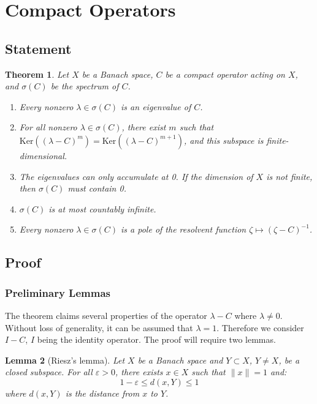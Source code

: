 \documentclass{article}
\newtheorem{theorem}{Theorem}
\newtheorem{lemma}[theorem]{Lemma}
\theoremstyle{definition}
\begin{document}
\section{Compact Operators}

\subsection{Statement}
\begin{theorem}
Let $X$ be a Banach space, $C$ be a compact operator acting on $X$, and $\sigma(C)$ be the spectrum of $C$.
\begin{enumerate}[label=\roman*.]
\item Every nonzero $\lambda \in \sigma(C)$ is an eigenvalue of $C$.
\item For all nonzero $\lambda \in \sigma(C)$, there exist $m$ such that $\text{Ker}((\lambda - C)^m) = \text{Ker}((\lambda - C)^{m+1})$, and this subspace is finite-dimensional.
\item The eigenvalues can only accumulate at 0. If the dimension of $X$ is not finite, then $\sigma(C)$ must contain 0.
\item $\sigma(C)$ is at most countably infinite.
\item Every nonzero $\lambda \in \sigma(C)$ is a pole of the resolvent function $\zeta \mapsto (\zeta - C)^{-1}$.
\end{enumerate}
\end{theorem}

\subsection{Proof}
\subsubsection*{Preliminary Lemmas}
The theorem claims several properties of the operator $\lambda - C$ where $\lambda \neq 0$. Without loss of generality, it can be assumed that $\lambda = 1$. Therefore we consider $I - C$, $I$ being the identity operator. The proof will require two lemmas.

\begin{lemma}[Riesz's lemma]
Let $X$ be a Banach space and $Y \subset X$, $Y \neq X$, be a closed subspace. For all $\varepsilon > 0$, there exists $x \in X$ such that $\|x\| = 1$ and:
\[1 - \varepsilon \leq d(x,Y) \leq 1\]
where $d(x,Y)$ is the distance from $x$ to $Y$.
\end{lemma}
\end{document}
